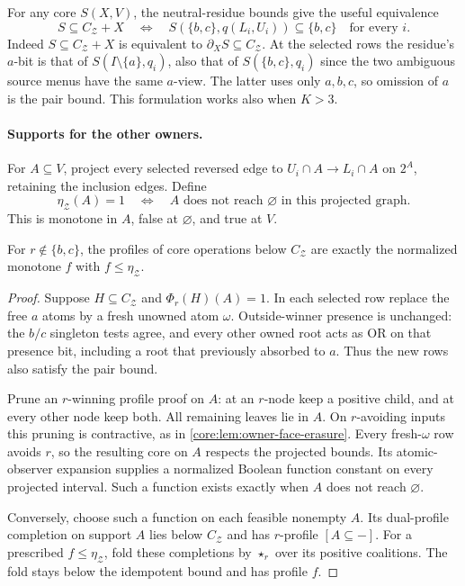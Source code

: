 For any core $S(X,V)$, the neutral-residue bounds give the useful equivalence
\begin{equation}\label{core:eq:pair-spine-tests}
 S\subseteq C_{\mathcal Z}+X
 \quad\Longleftrightarrow\quad
 S(\{b,c\},q(L_i,U_i))\subseteq\{b,c\}\quad\text{for every }i.
\end{equation}
Indeed $S\subseteq C_{\mathcal Z}+X$ is equivalent to
$\partial_XS\subseteq C_{\mathcal Z}$. At the selected rows the
residue's $a$-bit is that of $S(I\setminus\{a\},q_i)$, also that of
$S(\{b,c\},q_i)$ since the two ambiguous source menus have the same
$a$-view. The latter uses only $a,b,c$, so omission of $a$ is the pair
bound. This formulation works also when $K>3$.

\paragraph{Supports for the other owners.}
For $A\subseteq V$, project every selected reversed edge to
$U_i\cap A\to L_i\cap A$ on $2^A$, retaining the inclusion edges.
Define
\[
 \eta_{\mathcal Z}(A)=1
 \quad\Longleftrightarrow\quad
 A\text{ does not reach }\varnothing\text{ in this projected graph}.
\]
This is monotone in $A$, false at $\varnothing$, and true at $V$.

\begin{lemma}
\label{core:lem:pair-support-profile}
For $r\notin\{b,c\}$, the profiles of core operations below
$C_{\mathcal Z}$ are exactly the normalized monotone $f$ with
$f\leq\eta_{\mathcal Z}$.
\end{lemma}
\begin{proof}
Suppose $H\subseteq C_{\mathcal Z}$ and $\Phi_r(H)(A)=1$.
In each selected row replace the free $a$ atoms by a fresh unowned
atom $\omega$. Outside-winner presence is unchanged: the $b/c$
singleton tests agree, and every other owned root acts as OR on that
presence bit, including a root that previously absorbed to $a$.
Thus the new rows also satisfy the pair bound.

Prune an $r$-winning profile proof on $A$: at an $r$-node keep a
positive child, and at every other node keep both. All remaining
leaves lie in $A$. On $r$-avoiding inputs this pruning is contractive,
as in \cref{core:lem:owner-face-erasure}. Every fresh-$\omega$ row
avoids $r$, so the resulting core on $A$ respects the projected bounds.
Its atomic-observer expansion supplies a normalized Boolean function
constant on every projected interval. Such a function exists exactly
when $A$ does not reach $\varnothing$.

Conversely, choose such a function on each feasible nonempty $A$.
Its dual-profile completion on support $A$ lies below
$C_{\mathcal Z}$ and has $r$-profile $[A\subseteq-]$.
For a prescribed $f\leq\eta_{\mathcal Z}$, fold these completions
by $\star_r$ over its positive coalitions. The fold stays below the
idempotent bound and has profile $f$.
\end{proof}

